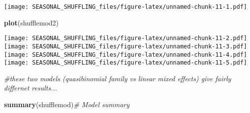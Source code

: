 \documentclass[]{article}
\newenvironment{Shaded}{\begin{snugshade}}{\end{snugshade}}
\newcommand{\CommentTok}[1]{\textcolor[rgb]{0.56,0.35,0.01}{\textit{#1}}}
\newcommand{\KeywordTok}[1]{\textcolor[rgb]{0.13,0.29,0.53}{\textbf{#1}}}
\newcommand{\NormalTok}[1]{#1}
\begin{document}
\texttt{[image: SEASONAL\_SHUFFLING\_files/figure-latex/unnamed-chunk-11-1.pdf]}

\begin{Shaded}
\begin{Highlighting}[]
\KeywordTok{plot}\NormalTok{(shufflemod2)}
\end{Highlighting}
\end{Shaded}

\texttt{[image: SEASONAL\_SHUFFLING\_files/figure-latex/unnamed-chunk-11-2.pdf]}
\texttt{[image: SEASONAL\_SHUFFLING\_files/figure-latex/unnamed-chunk-11-3.pdf]}
\texttt{[image: SEASONAL\_SHUFFLING\_files/figure-latex/unnamed-chunk-11-4.pdf]}
\texttt{[image: SEASONAL\_SHUFFLING\_files/figure-latex/unnamed-chunk-11-5.pdf]}

\begin{Shaded}
\begin{Highlighting}[]
\CommentTok{#these two models (quasibinomial family vs linear mixed effects) give fairly differnet results...}

\KeywordTok{summary}\NormalTok{(shufflemod)}\CommentTok{# Model summary}
\end{Highlighting}
\end{Shaded}
\end{document}
